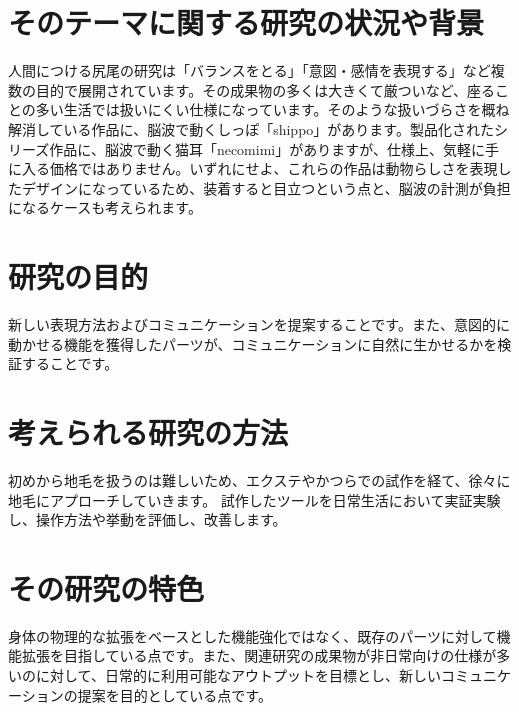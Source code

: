 \documentclass[a4paper]{jsarticle}
\begin{document}
\section{そのテーマに関する研究の状況や背景}
人間につける尻尾の研究は「バランスをとる」「意図・感情を表現する」など複数の目的で展開されています。その成果物の多くは大きくて厳ついなど、座ることの多い生活では扱いにくい仕様になっています。そのような扱いづらさを概ね解消している作品に、脳波で動くしっぽ「shippo」があります。製品化されたシリーズ作品に、脳波で動く猫耳「necomimi」がありますが、仕様上、気軽に手に入る価格ではありません。いずれにせよ、これらの作品は動物らしさを表現したデザインになっているため、装着すると目立つという点と、脳波の計測が負担になるケースも考えられます。

\section{研究の目的} 
新しい表現方法およびコミュニケーションを提案することです。また、意図的に動かせる機能を獲得したパーツが、コミュニケーションに自然に生かせるかを検証することです。

\section{考えられる研究の方法} 
初めから地毛を扱うのは難しいため、エクステやかつらでの試作を経て、徐々に地毛にアプローチしていきます。 試作したツールを日常生活において実証実験し、操作方法や挙動を評価し、改善します。

\section{その研究の特色}
身体の物理的な拡張をベースとした機能強化ではなく、既存のパーツに対して機能拡張を目指している点です。また、関連研究の成果物が非日常向けの仕様が多いのに対して、日常的に利用可能なアウトプットを目標とし、新しいコミュニケーションの提案を目的としている点です。
\end{document}
